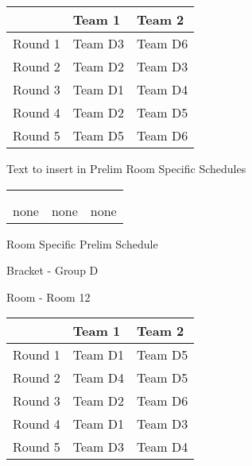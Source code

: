 \documentclass{article}%
\begin{document}
%
\begin{tabularx}{\textwidth}{|c|Y|Y|}%
\hline%
&Team 1&Team 2\\%
\hline%
Round 1&Team D3&Team D6\\%
Round 2&Team D2&Team D3\\%
Round 3&Team D1&Team D4\\%
Round 4&Team D2&Team D5\\%
Round 5&Team D5&Team D6\\%
\hline%
\end{tabularx}%
\vspace*{8pt}%
Text to insert in Prelim Room Specific Schedules%
\vspace*{30pt}%
\newline%
%
\begin{tabularx}{\textwidth}{YYY}%
  &  &  \\%
\\%
none&none&none\\%
\end{tabularx}%
\newpage%
\begin{center}%
\begin{Huge}%
Room Specific Prelim Schedule%
\end{Huge}%
\vspace*{8pt}%
\linebreak%
\begin{Large}%
Bracket {-} Group D%
\end{Large}%
\vspace*{8pt}%
\linebreak%
\vspace*{8pt}%
\begin{Large}%
Room {-} Room 12%
\end{Large}%
\end{center}%
%
\begin{tabularx}{\textwidth}{|c|Y|Y|}%
\hline%
&Team 1&Team 2\\%
\hline%
Round 1&Team D1&Team D5\\%
Round 2&Team D4&Team D5\\%
Round 3&Team D2&Team D6\\%
Round 4&Team D1&Team D3\\%
Round 5&Team D3&Team D4\\%
\hline%
\end{tabularx}%
\vspace*{8pt}%
\end{document}
